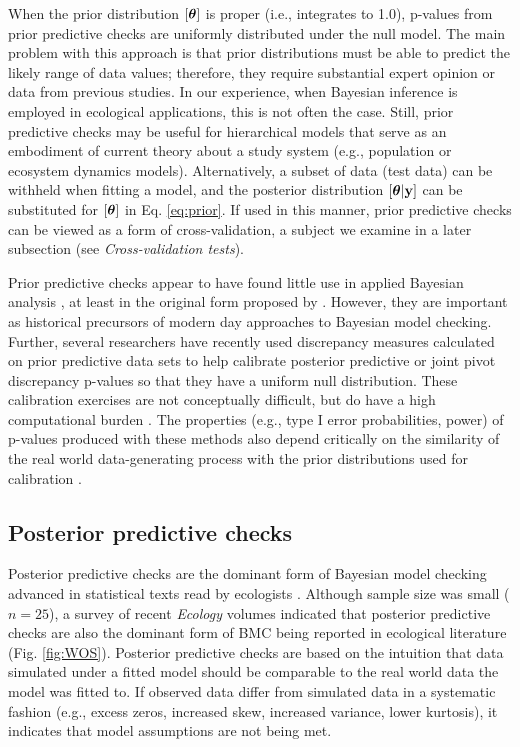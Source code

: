 \documentclass[12pt,english]{article}
\begin{document}
\begin{spacing}{1.9}
When the prior distribution $[\boldsymbol{\theta}]$ is proper (i.e., integrates to 1.0), p-values from prior predictive checks are uniformly
distributed under the null model.  The main problem with this approach is that prior distributions must be able to predict the likely range of data values; therefore, they require substantial expert opinion or data from
previous studies.  In our experience, when Bayesian inference is
employed in ecological applications, this is not often the case.
Still, prior predictive checks may be useful for hierarchical models
that serve as an embodiment of current theory about a study system
(e.g., population or ecosystem dynamics models).  Alternatively, a
subset of data (test data) can be withheld when fitting a model, and
the posterior distribution $[\boldsymbol{\theta}|{\bf y}]$ can be substituted for
$[\boldsymbol{\theta}]$ in Eq. \ref{eq:prior}.  If used in this manner, prior
predictive checks can be viewed as a form of cross-validation, a
subject we examine in a later subsection (see
\textit{Cross-validation tests}).

Prior predictive checks appear to have found little use in applied
Bayesian analysis \citep[but see][]{DeyEtAl1998}, at least in the
original form proposed by \citet{Box1980}. However, they are important
as historical precursors of modern day approaches to Bayesian model
checking. Further, several researchers have recently used discrepancy
measures calculated on prior predictive data sets to help calibrate
posterior predictive \citep[e.g.,][]{HjortEtAl2006} or joint pivot
discrepancy \citep{Johnson2007} p-values so that they have a uniform
null distribution.  These calibration exercises are not conceptually
difficult, but do have a high computational burden
\citep{YuanJohnson2012}. The properties (e.g., type I error
probabilities, power) of p-values produced with these methods also
depend critically on the similarity of the real world data-generating
process with the prior distributions used for calibration
\citep{Zhang2014}.

\subsection{Posterior predictive checks}

Posterior predictive checks are the dominant form of Bayesian model
checking advanced in statistical texts read by ecologists
\citep[e.g.,][]{KingEtAl2009,LinkBarker2010,KerySchaub2012,GelmanEtAl2014}. Although
sample size was small ($n=25$), a survey of recent \textit{Ecology}
volumes indicated that posterior predictive checks are also the
dominant form of BMC being reported in ecological
literature (Fig. \ref{fig:WOS}).
Posterior predictive checks are based on the intuition that data
simulated under a fitted model should be comparable to the real world
data the model was fitted to. If observed data differ from simulated
data in a systematic fashion (e.g., excess zeros, increased skew, increased variance,
lower kurtosis), it indicates that model assumptions are not
being met.


\end{spacing}
\end{document}
